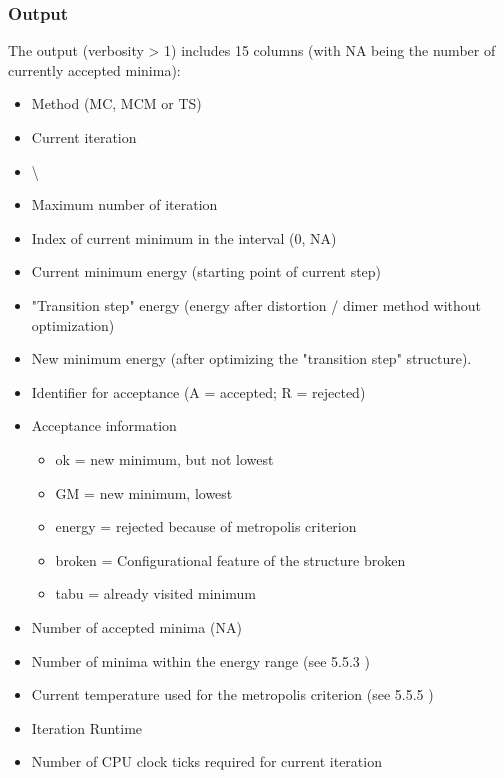 \documentclass[10pt,a4paper]{article} %
\newif\ifdevmode %
\begin{document}
{	\subsubsection{Output}
	The output (verbosity > 1) includes 15 columns (with NA being the number of currently accepted minima):\\
	\begin{itemize}
		\item Method (MC, MCM or TS)
		\item Current iteration
		\item \textbackslash \ifdevmode \colorbox{red}{I guess that means blank line, does it?} \fi
		\item Maximum number of iteration
		\item Index of current minimum in the interval (0, NA)
		\item Current minimum energy (starting point of current step)
		\item "Transition step" energy (energy after distortion / dimer method without optimization)
		\item New minimum energy (after optimizing the "transition step" structure).
		\item Identifier for acceptance (A = accepted; R = rejected)
		\item Acceptance information
		\begin{itemize}
			\item ok = new minimum, but not lowest
			\item GM = new minimum, lowest
			\item energy = rejected because of metropolis criterion
			\item broken = Configurational feature of the structure broken
			\item tabu = already visited minimum
		\end{itemize}
		\item Number of accepted minima (NA)
		\item Number of minima within the energy range (see 5.5.3 \ifdevmode \colorbox{red}{This number needs to be updated} \fi)
		\item Current temperature used for the metropolis criterion (see 5.5.5 \ifdevmode \colorbox{red}{This number needs to be updated} \fi)
		\item Iteration Runtime
		\item Number of CPU clock ticks required for current iteration
	\end{itemize}

}
\end{document}

